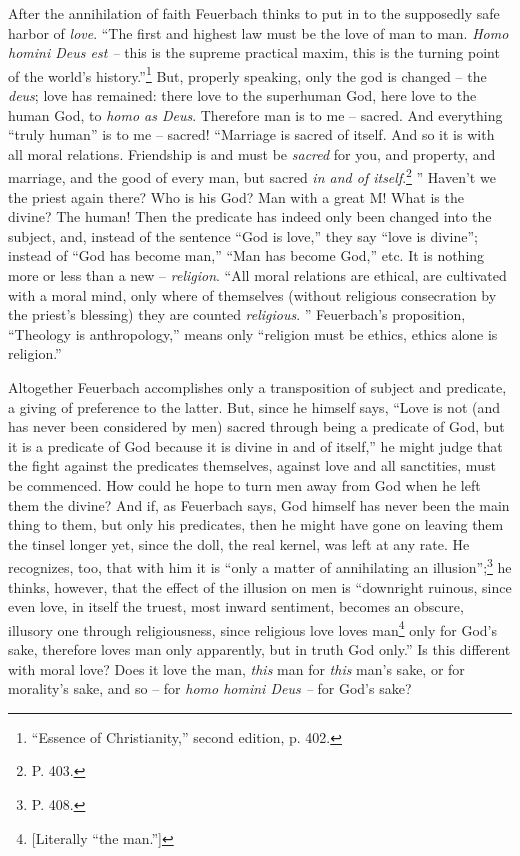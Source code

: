 After the annihilation of faith Feuerbach thinks to put in to the supposedly 
safe harbor of \textit{love}. ``The first and highest law must be the love of 
man to man. \textit{Homo homini Deus est --} this is the supreme practical 
maxim, this is the turning point of the world's 
history.''\footnote{``Essence of Christianity,'' second edition, p. 402.} 
But, properly speaking, only the god is changed -- the \textit{deus}; love has 
remained: there love to the superhuman God, here love to the human God, to 
\textit{homo as Deus}. Therefore man is to me -- sacred. And everything 
``truly human'' is to me -- sacred! ``Marriage is sacred of itself. And so 
it is with all moral relations. Friendship is and must be \textit{sacred} for 
you, and property, and marriage, and the good of every man, but sacred 
\textit{in and of itself}.\footnote{P. 403.} '' Haven't we the priest again 
there? Who is his God? Man with a great M! What is the divine? The human! Then 
the predicate has indeed only been changed into the subject, and, instead of 
the sentence ``God is love,'' they say ``love is divine''; instead of 
``God has become man,'' ``Man has become God,'' etc. It is nothing more or 
less than a new -- \textit{religion}. ``All moral relations are ethical, are 
cultivated with a moral mind, only where of themselves (without religious 
consecration by the priest's blessing) they are counted \textit{religious}. 
'' Feuerbach's proposition, ``Theology is anthropology,'' means only 
``religion must be ethics, ethics alone is religion.''

Altogether Feuerbach accomplishes only a transposition of subject and 
predicate, a giving of preference to the latter. But, since he himself says, 
``Love is not (and has never been considered by men) sacred through being a 
predicate of God, but it is a predicate of God because it is divine in and of 
itself,'' he might judge that the fight against the predicates themselves, 
against love and all sanctities, must be commenced. How could he hope to turn 
men away from God when he left them the divine? And if, as Feuerbach says, God 
himself has never been the main thing to them, but only his predicates, then 
he might have gone on leaving them the tinsel longer yet, since the doll, the 
real kernel, was left at any rate. He recognizes, too, that with him it is 
``only a matter of annihilating an illusion'';\footnote{P. 408.} he thinks, 
however, that the effect of the illusion on men is ``downright ruinous, since 
even love, in itself the truest, most inward sentiment, becomes an obscure, 
illusory one through religiousness, since religious love loves 
man\footnote{[Literally ``the man.'']} only for God's sake, therefore loves 
man only apparently, but in truth God only.'' Is this different with moral 
love? Does it love the man, \textit{this} man for \textit{this} man's sake, or 
for morality's sake, and so -- for \textit{homo homini Deus --} for God's 
sake?

